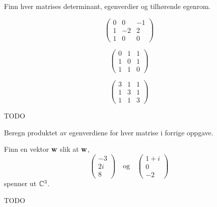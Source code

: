 \begin{oppgave}
Finn hver matrises determinant, egenverdier og tilhørende egenrom. 
\begin{punkt}
\[
\begin{pmatrix}
0 & 0 & -1 \\ 1 & -2 & 2 \\ 1 & 0 & 0 
\end{pmatrix}
\]
\end{punkt}

\begin{punkt}
\[
\begin{pmatrix}
0 & 1 & 1 \\ 1 & 0 & 1 \\ 1 & 1 & 0 
\end{pmatrix}
\]
\end{punkt}


\begin{punkt}
\[
\begin{pmatrix}
3 & 1 & 1 \\ 1 & 3 & 1 \\ 1 & 1 & 3 
\end{pmatrix}
\]
\end{punkt}

\end{oppgave}


\begin{losning}
TODO
\end{losning}

\begin{oppgave}
Beregn produktet av egenverdiene for hver matrise i forrige oppgave.
\end{oppgave}

\begin{oppgave}
Finn en vektor $\mathbf{w}$ slik at $\mathbf{w}$, 
\[
\begin{pmatrix}
-3 \\ 2i \\ 8 
\end{pmatrix}
\quad 
\text{og}
\quad 
\begin{pmatrix}
1+i \\ 0 \\ -2 
\end{pmatrix}
\]
spenner ut $\mathbb{C}^3$.
\end{oppgave}

\begin{losning}
TODO
\end{losning}


